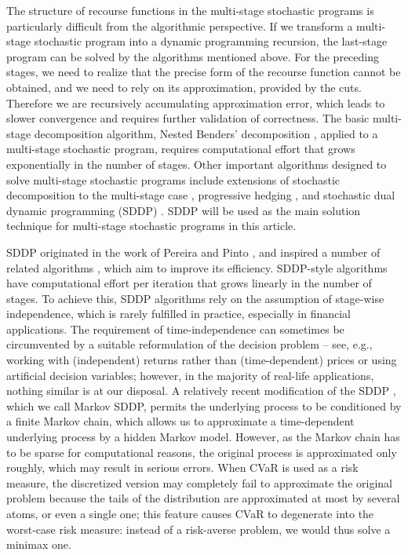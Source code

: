 \documentclass{article}              %
\begin{document}
The structure of recourse functions in the multi-stage stochastic programs is particularly difficult from the algorithmic perspective. If we transform a multi-stage stochastic program into a dynamic programming recursion, the last-stage program can be solved by the algorithms mentioned above. For the preceding stages, we need to realize that the precise form of the recourse function cannot be obtained, and we need to rely on its approximation, provided by the cuts. Therefore we are recursively accumulating approximation error, which leads to slower convergence and requires further validation of correctness. The basic multi-stage decomposition algorithm, Nested Benders' decomposition  \cite{birge_85}, applied to a multi-stage stochastic program, requires computational effort that grows exponentially  in the number of stages. Other important algorithms designed to solve multi-stage stochastic programs include extensions of stochastic decomposition to the multi-stage case \cite{stochdecomp,sen_zhou_2012}, progressive hedging \cite{rockafellar_wets_91}, and stochastic dual dynamic programming (SDDP) \cite{pereirapinto}. SDDP will be used as the main solution technique for multi-stage stochastic programs in this article.

SDDP originated in the work of Pereira and Pinto \cite{pereirapinto}, and inspired a number of related algorithms \cite{chen_powell_99,donohue_birge_06,linowsky_philpott_05,philpott_guan_08}, which aim to improve its efficiency. SDDP-style algorithms have computational effort per iteration that grows linearly in the number of stages. To achieve this, SDDP algorithms rely on the assumption of stage-wise independence, which is rarely
fulfilled in practice, especially in financial applications.
The requirement of time-independence can sometimes be circumvented by a suitable
reformulation of the decision problem -- see, e.g., \cite{kozmik2014evaluating}
working with (independent) returns rather than (time-dependent) prices or \cite{lohndorf2019modeling} using artificial decision variables;
however, in the majority of real-life applications, nothing similar
is at our disposal. A relatively recent modification of the SDDP
\cite{philpott2013solving}, which we call Markov SDDP, permits the
underlying process to be conditioned by a finite Markov chain, which 
allows us to approximate a time-dependent underlying process by a hidden
Markov model. However, as the Markov chain has to be sparse for computational
reasons, the original process is approximated only
roughly, which may result in serious errors. When CVaR is used as a risk measure, the discretized version may completely fail to approximate the original problem because the tails of the distribution are approximated at most by several atoms, or even a single one; this feature causes CVaR to degenerate into the worst-case risk measure: instead of a risk-averse problem, we would thus solve a minimax one. 
\end{document}
